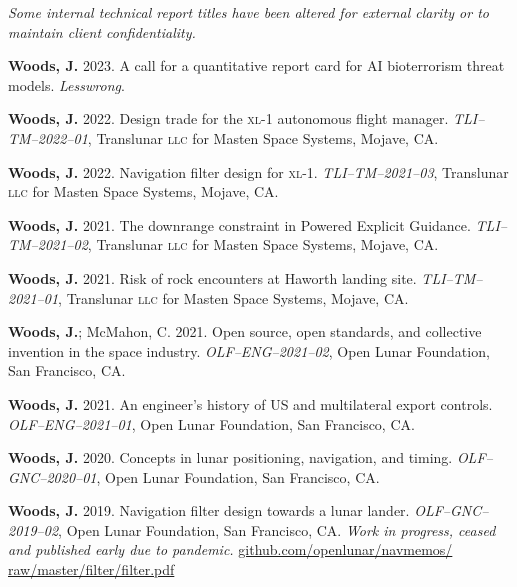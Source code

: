 \documentclass[12pt,letterpaper]{article}
\newcommand{\mhead}[1]{\leavevmode\marginpar{\sffamily\footnotesize #1}}
\begin{document}
{\bigskip
\mhead{Technical \newline Reports}%
\par\vspace{-\baselineskip}\textit{Some internal technical report titles have been altered for external clarity or to maintain client confidentiality.}

\medskip
\par\textbf{Woods, J.} 2023. A call for a quantitative report card for AI bioterrorism threat models. \textit{Lesswrong}.

\medskip
\par\textbf{Woods, J.} 2022. Design trade for the \textsc{xl}-1 autonomous flight manager. \textit{TLI--TM--2022--01}, Translunar \textsc{llc} for Masten Space Systems, Mojave, CA.

\medskip
\par\textbf{Woods, J.} 2022. Navigation filter design for \textsc{xl}-1. \textit{TLI--TM--2021--03}, Translunar \textsc{llc} for Masten Space Systems, Mojave, CA.

\medskip
\par\textbf{Woods, J.} 2021. The downrange constraint in Powered Explicit Guidance. \textit{TLI--TM--2021--02}, Translunar \textsc{llc} for Masten Space Systems, Mojave, CA.

\medskip
\par\textbf{Woods, J.} 2021. Risk of rock encounters at Haworth landing site. \textit{TLI--TM--2021--01}, Translunar \textsc{llc} for Masten Space Systems, Mojave, CA.

\medskip
\par\textbf{Woods, J.}; McMahon, C. 2021. Open source, open standards, and collective invention in the space industry. \textit{OLF--ENG--2021--02}, Open Lunar Foundation, San Francisco, CA.

\medskip
\par\textbf{Woods, J.} 2021. An engineer's history of US and multilateral export controls. \textit{OLF--ENG--2021--01}, Open Lunar Foundation, San Francisco, CA.

\medskip
\par\textbf{Woods, J.} 2020. Concepts in lunar positioning, navigation, and timing. \textit{OLF--GNC--2020--01}, Open Lunar Foundation, San Francisco, CA.

\medskip
\par\textbf{Woods, J.} 2019. Navigation filter design towards a lunar lander. \textit{OLF--GNC--2019--02}, Open Lunar Foundation, San Francisco, CA. \textit{Work in progress, ceased and published early due to pandemic.} \href{https://github.com/openlunar/navmemos/raw/master/filter/filter.pdf}{github.com/openlunar/navmemos/ raw/master/filter/filter.pdf}

}
\end{document}
